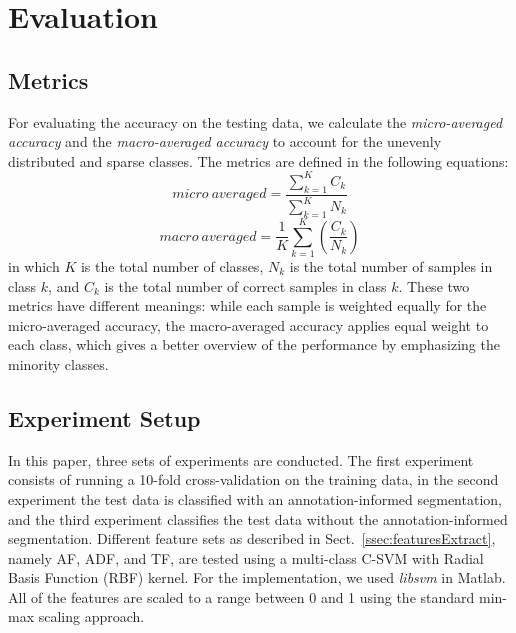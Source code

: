 \documentclass{article}
\begin{document}
\section{Evaluation}\label{sec:eval}
\subsection{Metrics}\label{ssec:metrics}
For evaluating the accuracy on the testing data, we calculate the \textit{micro-averaged accuracy} and the \textit{macro-averaged accuracy}\cite{yang1999} to account for the unevenly distributed and sparse classes. The metrics are defined in the following equations:
\begin{equation}
micro~averaged = \frac{ \sum_{k = 1}^{K} C_{k} }{ \sum_{k = 1}^{K} N_{k} }
\end{equation}
\begin{equation}
macro~averaged = \frac{1}{K} \sum_{k = 1}^{K} \left(\frac{C_{k}}{N_{k}}\right)
\end{equation}
in which $K$ is the total number of classes, $N_{k}$ is the total number of samples in class $k$, and $C_{k}$ is the total number of correct samples in class $k$. These two metrics have different meanings: while each sample is weighted equally for the micro-averaged accuracy, the macro-averaged accuracy applies equal weight to each class, which gives a better overview of the performance by emphasizing the minority classes.

\subsection{Experiment Setup}
In this paper, three sets of experiments are conducted. The first experiment consists of running a 10-fold cross-validation on the training data, in the second experiment the test data is classified with an annotation-informed segmentation, and the third experiment classifies the test data without the annotation-informed segmentation. Different feature sets as described in Sect.~\ref{ssec:featuresExtract}, namely AF, ADF, and TF, are tested using a multi-class C-SVM with Radial Basis Function (RBF) kernel. For the implementation, we used \textit{libsvm}\cite{Chang2011} in Matlab.  All of the features are scaled to a range between 0 and 1 using the standard min-max scaling approach.
\end{document}
